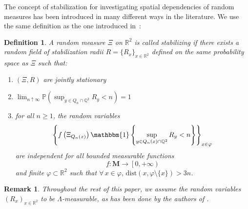 \documentclass[10pt,a4paper]{amsart}
\theoremstyle{exampstyle}
\newtheorem{Definition}{Definition}
\newtheorem{Remark}{Remark}
\theoremstyle{exampnotations}
\newcommand{\indep}{\rotatebox[origin=c]{90}{$\models$}}
\begin{document}
The concept of stabilization for investigating spatial dependencies of random measures has been introduced in many different ways in the literature. We use the same definition as the one introduced in~\cite{hirsch2018continuum}:
\begin{Definition}\cite[Definition 2.3]{hirsch2018continuum}
\label{Def.stabilizing}
A random measure $\Xi$ on $\mathbb{R}^{2}$ is called \emph{stabilizing} if there exists a random field of stabilization radii $R = \lbrace R_{x} \rbrace _{x \in \mathbb{R}^{2}}$ defined on the same probability space as $\Xi$ such that:
\begin{enumerate}[label = (\arabic*)]
\item $(\Xi,R)$ are jointly stationary
\item $\displaystyle \lim_{n \uparrow \infty} \mathbb{P}\left(\sup _{y \in Q_{n} \cap \mathbb{Q}^{2}} R_{y} < n\right) = 1$
\item for all $n \geq 1$, the random variables 
$$ \left\lbrace f\left(\Xi_{Q_{n}(x)}\right)\mathbbm{1}\left\lbrace \sup_{y \in Q_{n}(x) \cap \mathbb{Q}^{2}} R_{y} < n \right\rbrace \right\rbrace _{x \in \varphi}$$
are independent for all bounded measurable functions $$f : \mathbf{M} \to \left[0, +\infty \right)$$ and finite $\varphi \subset \mathbb{R}^{2}$ such that $\forall \, x \in \varphi, \, \text{dist}(x, \varphi \setminus \lbrace x \rbrace ) > 3n$.
\end{enumerate}
\end{Definition}
\begin{Remark}
Throughout the rest of this paper, we assume the random variables $(R_x)_{x \in \mathbb{R}^{2}}$ to be $\Lambda$-measurable, as has been done by the authors of \cite{hirsch2018continuum}.
\end{Remark}
\end{document}
